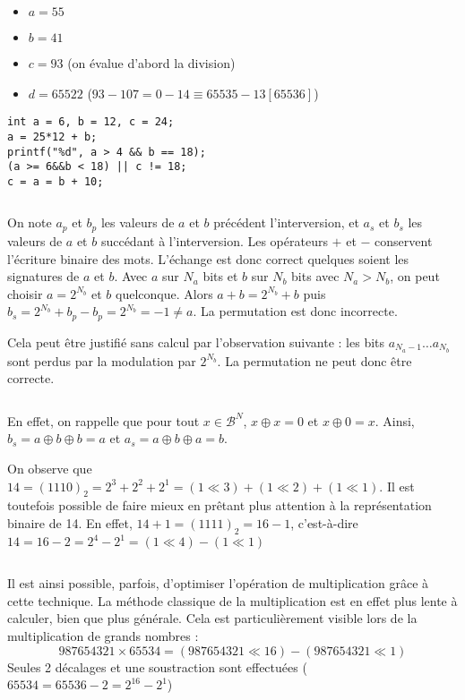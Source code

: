 \documentclass[../main.tex]{subfiles}
\begin{document}
\begin{itemize}
	\item $a = 55$
	\item $b = 41$
	\item $c = 93$ (on évalue d'abord la division)
	\item $d = 65522$ ($93 - 107 = 0 - 14 \equiv 65535 - 13 [65536]$)
\end{itemize}
\begin{verbatim}
int a = 6, b = 12, c = 24;
a = 25*12 + b;
printf("%d", a > 4 && b == 18);
(a >= 6&&b < 18) || c != 18;
c = a = b + 10;
\end{verbatim}
\inputminted{c}{solutions/inter_no_side_effect_1.c}
On note $a_{p}$ et $b_{p}$ les valeurs de $a$ et $b$ précédent l'interversion, et $a_{s}$ et $b_{s}$ les valeurs de $a$ et $b$ succédant à l'interversion.  
Les opérateurs $+$ et $-$ conservent l'écriture binaire des mots. L'échange est donc correct quelques soient les signatures de $a$ et $b$. 
Avec $a$ sur $N_{a}$ bits et $b$ sur $N_{b}$ bits avec $N_{a} > N_{b}$, on peut choisir $a = 2^{N_{b}}$ et $b$ quelconque. Alors $a + b = 2^{N_{b}}+b$ puis $b_{s} = 2^{N_{b}}+b_{p} - b_{p} = 2^{N_{b}} = -1 \neq{a}$. La permutation est donc incorrecte.
 
Cela peut être justifié sans calcul par l'observation suivante : les bits $a_{N_{a}-1}\dots a_{N_b}$ sont perdus par la modulation par $2^{N_{b}}$. La permutation ne peut donc être correcte.
 
\inputminted{c}{solutions/inter_no_side_effect_2.c}
En effet, on rappelle que pour tout ${x\in{\mathcal{B}^{N}}}$, $x\oplus{x} = 0$ et $x\oplus{0} = x$. Ainsi, $b_{s} = a\oplus{b}\oplus{b} = a$ et $a_{s} = a\oplus{b}\oplus{a} = b$.
 
 On observe que $14 = (1110)_{2} = 2^{3} + 2^{2} + 2^{1} = (1 \ll 3) + (1 \ll 2) + (1 \ll 1)$. Il est toutefois possible de faire mieux en prêtant plus attention à la représentation binaire de 14. En effet, $14 + 1 = (1111)_{2} = 16 - 1$, c'est-à-dire $14 = 16 - 2 = 2^{4} - 2^{1} = (1 \ll 4) - (1 \ll 1)$
\inputminted{c}{solutions/mult_decalage.c}
Il est ainsi possible, parfois, d'optimiser l'opération de multiplication grâce à cette technique. La méthode classique de la multiplication est en effet plus lente à calculer, bien que plus générale. Cela est particulièrement visible lors de la multiplication de grands nombres :
$$987654321\times{65534} = (987654321 \ll 16) - (987654321 \ll 1)$$
Seules 2 décalages et une soustraction sont effectuées ($65534 = 65536 - 2 = 2^{16} - 2^{1}$)
 
\end{document}
